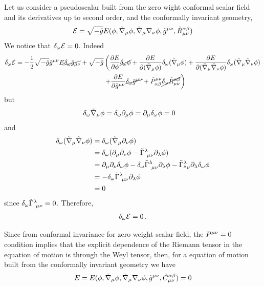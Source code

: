 Let us consider a pseudoscalar built from the zero wight conformal scalar field and its derivatives up to second order, and the conformally invariant geometry,
\begin{equation}
  \mathcal{E}=\sqrt{-\tilde{g}}E(\phi,\tilde{\nabla}_\mu\phi ,\tilde{\nabla}_\mu\nabla_\nu \phi ,\tilde{g}^{\mu\nu },\tilde{R}_{\mu\nu }^{\alpha\beta })
\end{equation}
We notice that $\delta_\omega\mathcal{E}=0$. Indeed
\begin{align*}
  \delta_\omega\mathcal{E}=-\frac{1}{2}\sqrt{-\tilde{g}}\tilde{g}^{\mu\nu }E\cancel{\delta_\omega\tilde{g}_{\mu\nu }}+\sqrt{-\tilde{g}}&\left(\pdv{E}{\phi}\cancel{\delta_\omega\phi} +\pdv{E}{(\tilde{\nabla}_\mu\phi)}\delta_\omega (\tilde{\nabla}_\mu\phi )+\pdv{E}{(\tilde{\nabla}_\mu\tilde{\nabla}_\nu\phi)}\delta_\omega(\tilde{\nabla}_\mu\tilde{\nabla}_\nu\phi )\right.\\&\left. +\pdv{E}{\tilde{g}^{\mu\nu}}\cancel{\delta_\omega\tilde{g}^{\mu\nu }}+\tilde{P}^{\mu\nu }_{\alpha\beta}\cancel{\delta_\omega\tilde{R}^{\alpha\beta }_{\mu\nu }}\right)
\end{align*}
but
\begin{align}
  \delta_\omega\tilde{\nabla}_\mu\phi&=\delta_\omega\partial_\mu\phi =\partial_\mu\delta_\omega\phi=0
\end{align}
and
\begin{align}
  \delta_\omega(\tilde{\nabla}_\mu\tilde{\nabla}_\nu\phi )&=\delta_\omega(\tilde{\nabla}_\mu\partial_\nu \phi )\\
 &=\delta_\omega(\partial_\mu\partial_\nu \phi -\tilde{\Gamma}^{\lambda}_{~\mu\nu }\partial_\lambda\phi )\\
 &=\partial_\mu\partial_\nu \delta_\omega\phi -\delta_\omega\tilde{\Gamma}^\lambda_{~\mu\nu }\partial_\lambda\phi -\tilde{\Gamma}^\lambda_{^\mu\nu }\partial_\lambda \delta_\omega\phi \\
 &=-\delta_\omega\tilde{\Gamma}^\lambda_{~\mu\nu }\partial_\lambda\phi\\
 &=0
\end{align}
since $\delta_\omega\tilde{\Gamma}^\lambda_{~\mu\nu }=0$. Therefore,
\begin{align}
  \delta_\omega\mathcal{E}=0\, .
\end{align}


Since from conformal invariance for zero weight scalar field, the $P^{\mu\nu }=0$ condition implies that the explicit dependence of the Riemann tensor in the equation of motion is through the Weyl tensor, then,  for a equation of motion built from the conformally invariant geometry we have
\begin{equation}
  E=E(\phi,\tilde{\nabla}_\mu\phi ,\tilde{\nabla}_\mu\nabla_\nu \phi ,\tilde{g}^{\mu\nu },\tilde{C}_{\mu\nu }^{\alpha\beta })=0
\end{equation}

